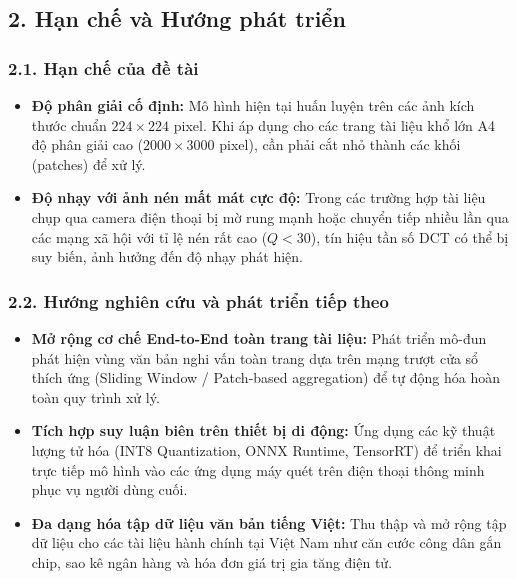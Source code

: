 \subsection{2. Hạn chế và Hướng phát triển}

\subsubsection{2.1. Hạn chế của đề tài}
\begin{itemize}[label={--}, itemsep=2pt]
    \item \textbf{Độ phân giải cố định:} Mô hình hiện tại huấn luyện trên các ảnh kích thước chuẩn $224 \times 224$ pixel. Khi áp dụng cho các trang tài liệu khổ lớn A4 độ phân giải cao ($2000 \times 3000$ pixel), cần phải cắt nhỏ thành các khối (patches) để xử lý.
    \item \textbf{Độ nhạy với ảnh nén mất mát cực độ:} Trong các trường hợp tài liệu chụp qua camera điện thoại bị mờ rung mạnh hoặc chuyển tiếp nhiều lần qua các mạng xã hội với tỉ lệ nén rất cao ($Q < 30$), tín hiệu tần số DCT có thể bị suy biến, ảnh hưởng đến độ nhạy phát hiện.
\end{itemize}

\subsubsection{2.2. Hướng nghiên cứu và phát triển tiếp theo}
\begin{itemize}[label={--}, itemsep=2pt]
    \item \textbf{Mở rộng cơ chế End-to-End toàn trang tài liệu:} Phát triển mô-đun phát hiện vùng văn bản nghi vấn toàn trang dựa trên mạng trượt cửa sổ thích ứng (Sliding Window / Patch-based aggregation) để tự động hóa hoàn toàn quy trình xử lý.
    \item \textbf{Tích hợp suy luận biên trên thiết bị di động:} Ứng dụng các kỹ thuật lượng tử hóa (INT8 Quantization, ONNX Runtime, TensorRT) để triển khai trực tiếp mô hình vào các ứng dụng máy quét trên điện thoại thông minh phục vụ người dùng cuối.
    \item \textbf{Đa dạng hóa tập dữ liệu văn bản tiếng Việt:} Thu thập và mở rộng tập dữ liệu cho các tài liệu hành chính tại Việt Nam như căn cước công dân gắn chip, sao kê ngân hàng và hóa đơn giá trị gia tăng điện tử.
\end{itemize}
